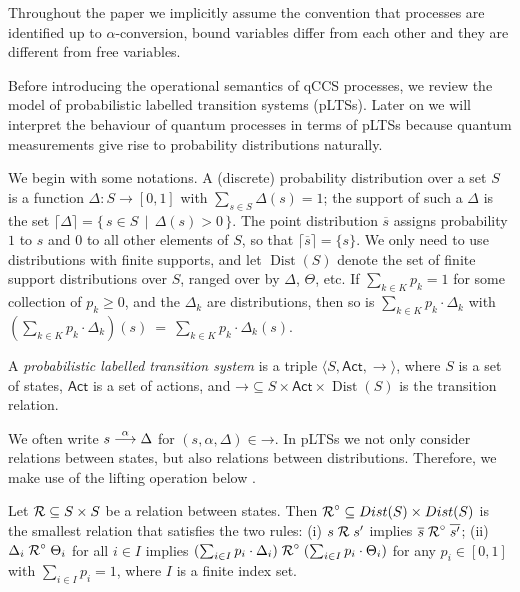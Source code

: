 \documentclass[a4paper,runningheads]{llncs}
\newcommand{\dist}[1]{\mathop{Dist} ({#1})   } %
\newcommand{\pdist}[1]{\overline{#1}  } %
\newcommand{\support}[1]{\lceil{#1}\rceil}
\newcommand{\lift}[1]{\mathrel{{#1}^\circ}}
\newcommand{\Act}{\ensuremath{\mathsf{Act}}\xspace}
\newcommand{\setof}[2]{\{ \, #1 \, \mid \, #2 \, \}}%
\begin{document}
Throughout the paper we implicitly assume the convention that processes are identified up to $\alpha$-conversion, bound variables differ from each other and they are different from free variables.

Before introducing the operational semantics of qCCS processes, we review the model of probabilistic labelled
transition systems (pLTSs). Later on we will interpret the behaviour
of quantum processes in terms of pLTSs because quantum measurements give rise to probability distributions naturally.

We begin with some notations. A (discrete) probability distribution
over a set $S$ is a function $\Delta \colon S \rightarrow [0, 1] $ with
$\sum_{s\in S} \Delta(s) = 1$; the support of such a $\Delta$ is
the set $\support{\Delta} = \setof{s \in S}{\Delta(s) > 0}$.
The point distribution $\pdist{s}$ assigns probability
$1$ to $s$ and $0$ to all other elements of $S$, so that
$\support{\pdist{s}} = \{s\}$. We only need to use distributions with finite supports, and let $\dist{S}$ denote the set of
finite support distributions over $S$, ranged over by $\Delta$, $\Theta$, etc.
If $\sum_{k \in K} p_k = 1$ for some
collection of  $p_k \geq 0$, and the $\Delta_k$ are distributions,
then so is $\sum_{k \in K}p_k \cdot \Delta_k$ with
$(\sum_{k \in K}p_k \cdot \Delta_k)(s)~=~\sum_{k\in K} p_k\cdot \Delta_k(s).$


\begin{definition}\label{def:LTS}
	A \emph{probabilistic labelled transition system}
	is a triple
	$\langle S, \Act,  \rightarrow  \rangle$, where
	$S$ is a set of states,
	$\Act$ is a set of actions, and $\mathord{\rightarrow} \subseteq
	S \times \Act \times \dist{S}$ is the transition relation.
\end{definition}

We often write $s\mathrel{\stackrel{\alpha}{\longrightarrow}}\Delta$ for $(s,\alpha,\Delta)\in\mathord{\rightarrow}$. %
In  pLTSs we not only consider relations between states, but also relations between distributions. Therefore, we make use of the lifting operation below \cite{Deng15}.
\begin{definition}\label{def:lift}
	Let  $\mathord{\mathrel{{\mathcal R }}} \subseteq
	S\times S$ be a relation between states.
	Then $\mathord{\lift{\aRel}} \subseteq \dist{S} \times
	\dist{S}$ is the smallest relation that satisfies the two rules:
	(i) $s \mathrel{{\mathcal R }} s'$ implies $\pdist{s} \lift{\aRel} \pdist{s'}$;
	(ii) $\Delta_i \lift{\aRel} \Theta_i$ for all $i\in I$ implies
	$(\sum_{i\in I}p_i\cdot\Delta_i)\lift{\aRel}(\sum_{i\in I}p_i\cdot\Theta_i)$
	for any $p_i \in [0,1]$ with $\sum_{i\in I}p_i = 1$, where $I$ is a
	finite index set.
\end{definition}
\end{document}

